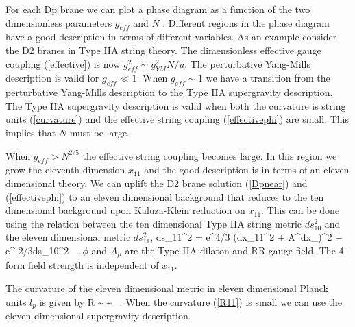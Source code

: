 For each Dp brane we can plot a phase diagram as a function
of the two dimensionless parameters $g_{eff}$ and $N$ \cite{Itzhaki:1998sa}.
Different regions in the phase diagram have a good description
in terms of different variables.  
As an example consider the D2 branes in Type IIA string theory.   
The dimensionless effective gauge coupling 
(\ref{effective})
is now $g_{eff}^2 \sim g_{YM}^2N/u$.
The perturbative Yang-Mills description is valid for $g_{eff}\ll 1$.
When  $g_{eff} \sim 1$ we have a transition from the perturbative Yang-Mills
description to the Type IIA supergravity description.
The Type IIA supergravity description is valid when both the curvature 
is string units (\ref{curvature})
and the effective string coupling (\ref{effectivephi})
are small. This implies that $N$ must be large.

When $g_{eff} > N^{2/5}$ the effective string coupling becomes large.
In this region we grow the eleventh dimension $x_{11}$ and the good
description is in terms of an eleven dimensional theory.  We can
uplift the D2 brane solution (\ref{Dpnear}) and (\ref{effectivephi})
to an eleven dimensional background that reduces to the ten
dimensional background upon Kaluza-Klein reduction on $x_{11}$.  This
can be done using the relation between the ten dimensional Type IIA
string metric $ds_{10}^2$ and the eleven dimensional metric
$ds_{11}^2$,
\beq
ds_{11}^2 = e^{4\phi/3} (dx_{11}^2 + A^{\mu}dx_{\mu})^2 +
e^{-2\phi/3}ds_{10}^2 \ .
\label{11d}
\eeq
$\phi$ and $A_{\mu}$ are the Type IIA dilaton and RR gauge field.
The 4-form field strength is independent of $x_{11}$.

The curvature of the eleven dimensional metric 
in eleven dimensional Planck units $l_p$
is given by 
\beq
{\cal R} \sim {} \sim
{} \ .
\label{R11}
\eeq
When the curvature (\ref{R11})
is small we can use the eleven dimensional
supergravity description.    

